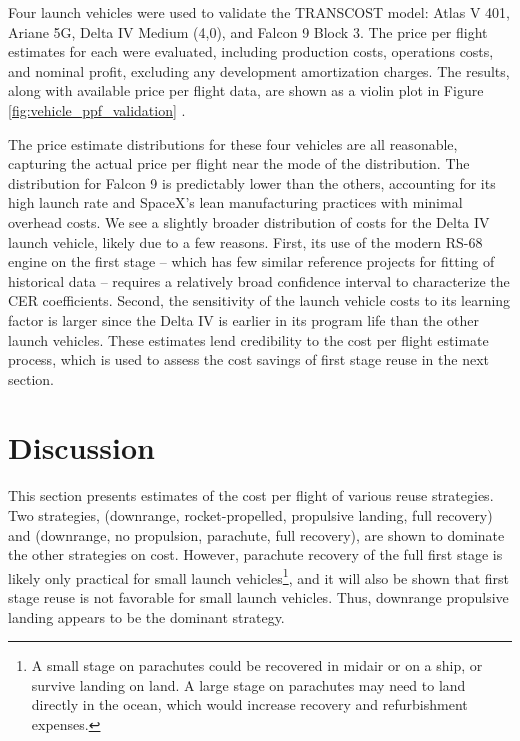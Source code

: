 \documentclass[conf]{new-aiaa}
\begin{document}
\begin{multicols}{2}
Four launch vehicles were used to validate the TRANSCOST model: Atlas V 401, Ariane 5G, Delta IV Medium (4,0), and Falcon 9 Block 3. The price per flight estimates for each were evaluated, including production costs, operations costs, and nominal profit, excluding any development amortization charges. The results, along with available price per flight data, are shown as a violin plot in Figure \ref{fig:vehicle_ppf_validation} \cite{ULARocketBuilder, FlightGlobalArianespace, GAO2017, SpaceXCapabilities}. 


The price estimate distributions for these four vehicles are all reasonable, capturing the actual price per flight near the mode of the distribution. The distribution for Falcon 9 is predictably lower than the others, accounting for its high launch rate and SpaceX's lean manufacturing practices with minimal overhead costs. We see a slightly broader distribution of costs for the Delta IV launch vehicle, likely due to a few reasons. First, its use of the modern RS-68 engine on the first stage -- which has few similar reference projects for fitting of historical data -- requires a relatively broad confidence interval to characterize the CER coefficients. Second, the sensitivity of the launch vehicle costs to its learning factor is larger since the Delta IV is earlier in its program life than the other launch vehicles. These estimates lend credibility to the cost per flight estimate process, which is used to assess  the cost savings of first stage reuse in the next section.

\section{Discussion}

This section presents estimates of the cost per flight of various reuse strategies. Two strategies, (downrange, rocket-propelled, propulsive landing, full recovery) and (downrange, no propulsion, parachute, full recovery), are shown to dominate the other strategies on cost. However, parachute recovery of the full first stage is likely only practical for small launch vehicles\footnote{A small stage on parachutes could be recovered in midair or on a ship, or survive landing on land. A large stage on parachutes may need to land directly in the ocean, which would increase recovery and refurbishment expenses.}, and it will also be shown that first stage reuse is not favorable for small launch vehicles. Thus, downrange propulsive landing appears to be the dominant strategy.


\end{multicols}
\end{document}
